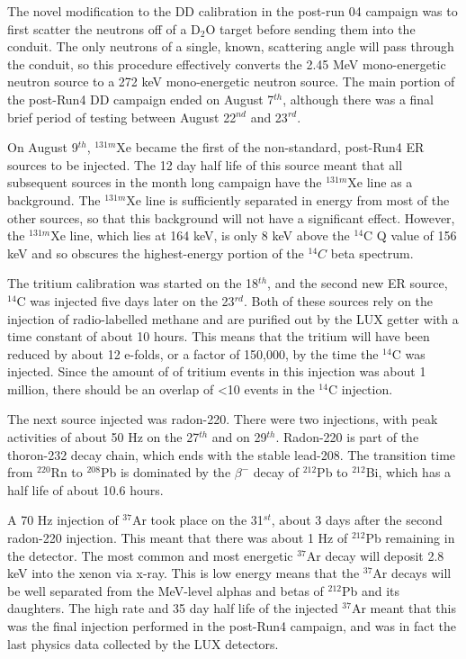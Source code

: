 The novel modification to the DD calibration in the post-run 04 campaign was to first scatter the neutrons off of a D$_2$O target before sending them into the conduit. The only neutrons of a single, known, scattering angle will pass through the conduit, so this procedure effectively converts the 2.45 MeV mono-energetic neutron source to a 272 keV mono-energetic neutron source. The main portion of the post-Run4 DD campaign ended on August 7$^{th}$, although there was a final brief period of testing between August 22$^{nd}$ and 23$^{rd}$.\cite{lux_dd1}


On August 9$^{th}$, $^{131m}$Xe became the first of the non-standard, post-Run4 ER sources to be injected. The 12 day half life of this source meant that all subsequent sources in the month long campaign have the $^{131m}$Xe line as a background. The $^{131m}$Xe line is sufficiently separated in energy from most of the other sources, so that this background will not have a significant effect. However, the $^{131m}$Xe line, which lies at 164 keV, is only 8 keV above the $^{14}$C Q value of 156 keV and so obscures the highest-energy portion of the $^{14}C$ beta spectrum.

The tritium calibration was started on the 18$^{th}$, and the second new ER source, $^{14}$C was injected five days later on the 23$^{rd}$. Both of these sources rely on the injection of radio-labelled methane and are purified out by the LUX getter with a time constant of about 10 hours. This means that the tritium will have been reduced by about 12 e-folds, or a factor of 150,000, by the time the $^{14}$C was injected. Since the amount of of tritium events in this injection was about 1 million, there should be an overlap of <10 events in the $^{14}$C injection.

The next source injected was radon-220. There were two injections, with peak activities of about 50 Hz on the 27$^{th}$ and on 29$^{th}$. Radon-220 is part of the thoron-232 decay chain, which ends with the stable lead-208. The transition time from $^{220}$Rn to $^{208}$Pb is dominated by the $\beta^-$ decay of $^{212}$Pb to $^{212}$Bi, which has a half life of about 10.6 hours. 

A 70 Hz injection of $^{37}$Ar took place on the 31$^{st}$, about 3 days after the second radon-220 injection. This meant that there was about 1 Hz of $^{212}$Pb remaining in the detector. The most common and most energetic $^{37}$Ar decay will deposit 2.8 keV into the xenon via x-ray. This is low energy means that the $^{37}$Ar decays will be well separated from the MeV-level alphas and betas of $^{212}$Pb and its daughters. The high rate and 35 day half life of the injected $^{37}$Ar meant that this was the final injection performed in the post-Run4 campaign, and was in fact the last physics data collected by the LUX detectors.

